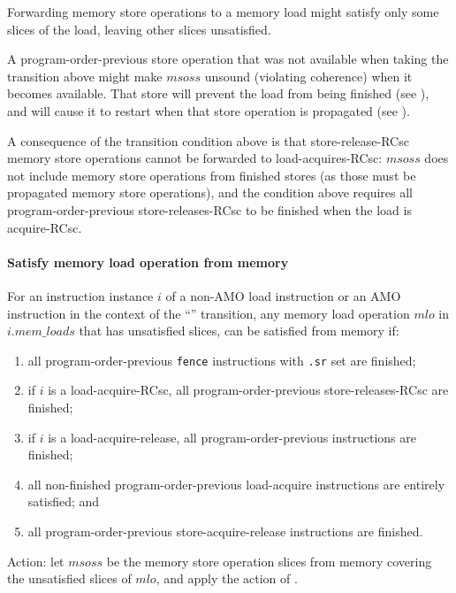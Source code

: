 \begin{commentary}
Forwarding memory store operations to a memory load might satisfy only some slices of the load, leaving other slices unsatisfied.

A program-order-previous store operation that was not available when taking the transition above might make $msoss$ unsound (violating coherence) when it becomes available.
That store will prevent the load from being finished (see ), and will cause it to restart when that store operation is propagated (see ).

A consequence of the transition condition above is that store-release-RCsc memory store operations cannot be forwarded to load-acquires-RCsc:
$msoss$ does not include memory store operations from finished stores (as those must be propagated memory store operations), and the condition above requires all program-order-previous store-releases-RCsc to be finished when the load is acquire-RCsc.
\end{commentary}


\paragraph{Satisfy memory load operation from memory}\label{omm:sat_from_mem}
For an instruction instance $i$ of a non-AMO load instruction or an AMO instruction in the context of the ``'' transition, any memory load operation $mlo$ in $i.\textit{mem\_loads}$ that has unsatisfied slices, can be satisfied from memory if:
\begin{enumerate}
\item all program-order-previous {\tt fence} instructions with {\tt .sr} set are finished;
\item if $i$ is a load-acquire-RCsc, all program-order-previous store-releases-RCsc are finished;
\item if $i$ is a load-acquire-release, all program-order-previous instructions are finished;
\item all non-finished program-order-previous load-acquire instructions are entirely satisfied; and
\item all program-order-previous store-acquire-release instructions are finished.
\end{enumerate}
Action: let $msoss$ be the memory store operation slices from memory covering the unsatisfied slices of $mlo$, and apply the action of .

